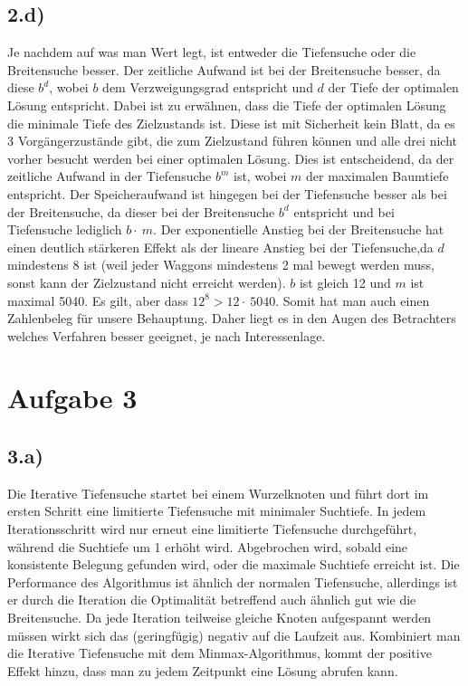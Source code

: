 \documentclass[a4paper]{article}
\begin{document}
\subsection*{2.d)}
Je nachdem auf was man Wert legt, ist entweder die Tiefensuche oder die Breitensuche besser. Der zeitliche Aufwand ist bei der Breitensuche besser, da diese $b^d$, wobei $b$ dem Verzweigungsgrad entspricht und $d$ der Tiefe der optimalen L\"osung entspricht. Dabei ist zu erw\"ahnen, dass die Tiefe der optimalen L\"osung die minimale Tiefe des Zielzustands ist. Diese ist mit Sicherheit kein Blatt, da es 3 Vorg\"angerzust\"ande gibt, die zum Zielzustand f\"uhren k\"onnen und alle drei nicht vorher besucht werden bei einer optimalen L\"osung.
Dies ist entscheidend, da der zeitliche Aufwand in der Tiefensuche $b^m$ ist, wobei $m$ der maximalen Baumtiefe entspricht. 
Der Speicheraufwand ist hingegen bei der Tiefensuche besser als bei der Breitensuche, da dieser bei der Breitensuche $b^d$ entspricht und bei Tiefensuche lediglich $b \cdot\ m$. Der exponentielle Anstieg bei der Breitensuche hat einen deutlich st\"arkeren Effekt als der lineare Anstieg bei der Tiefensuche,da $d$ mindestens 8 ist (weil jeder Waggons mindestens 2 mal bewegt werden muss, sonst kann der Zielzustand nicht erreicht werden). $b$ ist gleich 12 und $m$ ist maximal 5040.
Es gilt, aber dass $12^8 > 12 \cdot\ 5040$. Somit hat man auch einen Zahlenbeleg f\"ur unsere Behauptung.
Daher liegt es in den Augen des Betrachters welches Verfahren besser geeignet, je nach Interessenlage.

\section*{Aufgabe 3}
\subsection*{3.a)}
Die Iterative Tiefensuche startet bei einem Wurzelknoten und führt dort im ersten Schritt eine limitierte Tiefensuche mit minimaler Suchtiefe. In jedem Iterationsschritt wird nur erneut eine limitierte Tiefensuche durchgeführt, während die Suchtiefe um 1 erhöht wird. Abgebrochen wird, sobald eine konsistente Belegung gefunden wird, oder die maximale Suchtiefe erreicht ist. Die Performance des Algorithmus ist ähnlich der normalen Tiefensuche, allerdings ist er durch die Iteration die Optimalität betreffend auch ähnlich gut wie die Breitensuche.
Da jede Iteration teilweise gleiche Knoten aufgespannt werden müssen wirkt sich das (geringfügig) negativ auf die Laufzeit aus. Kombiniert man die Iterative Tiefensuche mit dem Minmax-Algorithmus, kommt der positive Effekt hinzu, dass man zu jedem Zeitpunkt eine Lösung abrufen kann.
\end{document}
